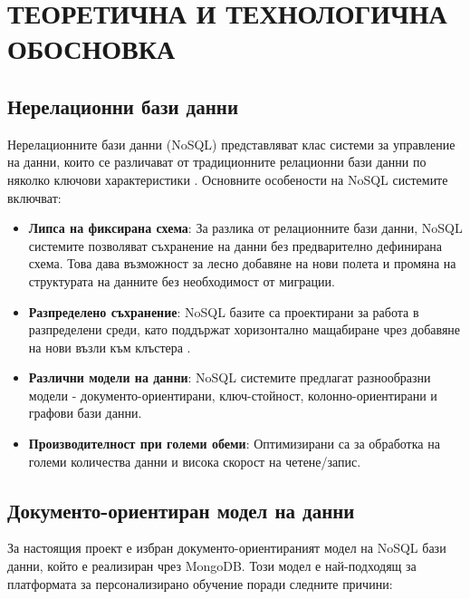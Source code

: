 
\section{ТЕОРЕТИЧНА И ТЕХНОЛОГИЧНА ОБОСНОВКА}

\subsection{Нерелационни бази данни}

Нерелационните бази данни (NoSQL) представляват клас системи за управление на данни, които се различават от традиционните релационни бази данни по няколко ключови характеристики \cite{kleppmann2017designing}. Основните особености на NoSQL системите включват:

\begin{itemize}
    \item \textbf{Липса на фиксирана схема}: За разлика от релационните бази данни, NoSQL системите позволяват съхранение на данни без предварително дефинирана схема. Това дава възможност за лесно добавяне на нови полета и промяна на структурата на данните без необходимост от миграции.
    \item \textbf{Разпределено съхранение}: NoSQL базите са проектирани за работа в разпределени среди, като поддържат хоризонтално мащабиране чрез добавяне на нови възли към клъстера \cite{cap_theorem}.
    \item \textbf{Различни модели на данни}: NoSQL системите предлагат разнообразни модели - документо-ориентирани, ключ-стойност, колонно-ориентирани и графови бази данни.
    \item \textbf{Производителност при големи обеми}: Оптимизирани са за обработка на големи количества данни и висока скорост на четене/запис.
\end{itemize}

\subsection{Документо-ориентиран модел на данни}

За настоящия проект е избран документо-ориентираният модел на NoSQL бази данни, който е реализиран чрез MongoDB. Този модел е най-подходящ за платформата за персонализирано обучение поради следните причини:

